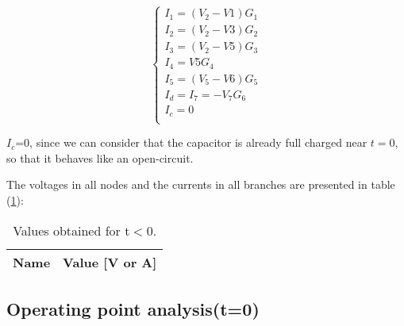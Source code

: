 \begin{equation}
  \begin{cases}
    I_{1}=(V_{2}-V{1})G_{1} \\
    I_{2}=(V_{2}-V{3})G_{2} \\
    I_{3}=(V_{2}-V{5})G_{3} \\
    I_{4}=V{5}G_{4}         \\
    I_{5}=(V_{5}-V{6})G_{5} \\
    I_{d}=I_{7}=-V_{7}G_{6} \\
    I_{c}=0                 \\
  \end{cases}
\end{equation}

$I_{c}$=0, since we can consider that the capacitor is already full charged near
$t=0$, so that it behaves like an open-circuit.

The voltages in all nodes and the
currents in all branches are presented in table (\ref{tab:1}):

\begin{table}[h]
  \centering
  \begin{tabular}{|l|r|}
    \hline
    {\bf Name} & {\bf Value [V or A]} \\ \hline
    
  \end{tabular}
  \caption{Values obtained for t$<$0.}
  \label{tab:1}
\end{table}

\newpage

\subsection{Operating point analysis(t=0)}\label{subsec:opA0}

